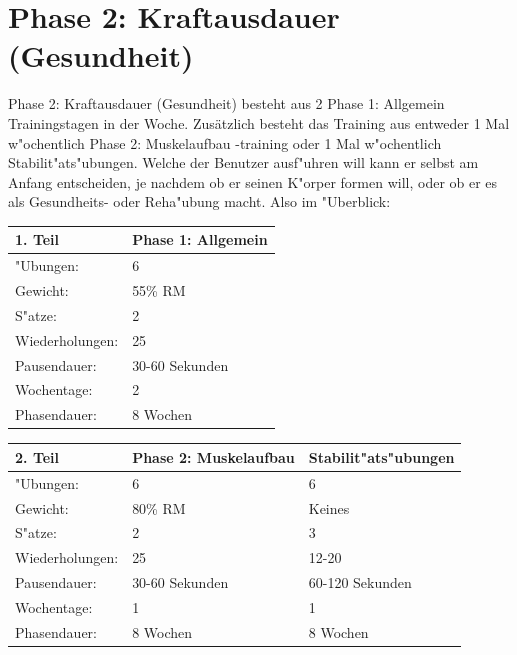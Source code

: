 \documentclass[a4paper,12pt]{article}
\begin{document}
	\section{Phase 2: Kraftausdauer (Gesundheit)}
	Phase 2: Kraftausdauer (Gesundheit) besteht aus 2 Phase 1: Allgemein Trainingstagen in der Woche. Zusätzlich besteht das Training aus entweder 1 Mal w"ochentlich Phase 2: Muskelaufbau -training oder 1 Mal w"ochentlich Stabilit"ats"ubungen. Welche der Benutzer ausf"uhren will kann er selbst am Anfang entscheiden, je nachdem ob er seinen K"orper formen will, oder ob er es als Gesundheits- oder Reha"ubung macht.
	\newline
	Also im "Uberblick:
	\newline
	\begin{center}
		\begin{tabular}{| l | l |}
			\hline
			1. Teil&Phase 1: Allgemein \\
			\hline
			"Ubungen: & 6 \\ \hline 
			Gewicht: & 55\% RM \\ \hline
			S"atze: & 2 \\ \hline
			Wiederholungen: & 25 \\ \hline
			Pausendauer: & 30-60 Sekunden \\ \hline
			Wochentage: & 2 \\ \hline
			Phasendauer: & 8 Wochen \\ \hline
		\end{tabular} 
	\end{center}
	\begin{center}
		\begin{tabular}{| l || l | l |}
			\hline
			 2. Teil & Phase 2: Muskelaufbau & Stabilit"ats"ubungen\\
			\hline
			"Ubungen: & 6  & 6\\ \hline 
			Gewicht: & 80\% RM & Keines \\ \hline
			S"atze: & 2 & 3 \\ \hline
			Wiederholungen: & 25 & 12-20 \\ \hline
			Pausendauer: & 30-60 Sekunden & 60-120 Sekunden \\ \hline
			Wochentage: & 1 & 1 \\ \hline
			Phasendauer: & 8 Wochen & 8 Wochen \\ \hline
		\end{tabular} 
	\end{center}
		
	\newpage	
\end{document}
